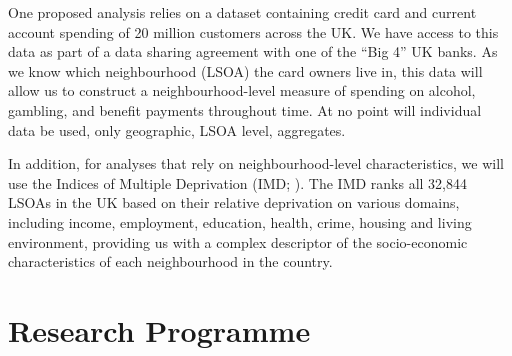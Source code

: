 \documentclass[11pt, a4paper]{article}
\begin{document}


One proposed analysis relies on a dataset containing credit card and current account spending of 20 million customers across the UK. We have access to this data as part of a data sharing agreement with one of the ``Big 4''  UK banks. As we know which neighbourhood (LSOA) the card owners live in, this data will allow us to construct a neighbourhood-level measure of spending on alcohol, gambling, and benefit payments throughout time. At no point will individual data be used, only geographic, LSOA level, aggregates. 

In addition, for analyses that rely on neighbourhood-level characteristics, we will use the Indices of Multiple Deprivation (IMD; ). The IMD ranks all 32,844 LSOAs in the UK based on their relative deprivation on various domains, including income, employment, education, health, crime, housing and living environment, providing us with a complex descriptor of the socio-economic characteristics of each neighbourhood in the country.



\section{Research Programme}
\end{document}
